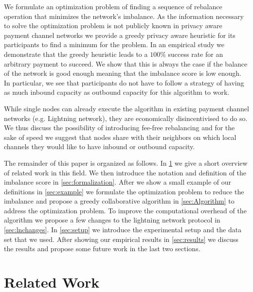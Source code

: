 \documentclass[a4paper]{paper}
\begin{document}
We formulate an optimization problem of finding a sequence of rebalance operation that minimizes the network's imbalance.
As the information necessary to solve the optimization problem is not publicly known in privacy aware payment channel networks we provide a greedy privacy aware heuristic for its participants to find a minimum for the problem. 
In an empirical study we demonstrate that the greedy heuristic leads to a $100\%$ success rate for an arbitrary payment to succeed.
We show that this is always the case if the balance of the network is good enough meaning that the imbalance score is low enough.
In particular, we see that participants do not have to follow a strategy of having as much inbound capacity as outbound capacity for this algorithm to work. 

While single nodes can already execute the algorithm in existing payment channel networks (e.g. Lightning network), they are economically disincentivised to do so.
We thus discuss the possibility of introducing fee-free rebalancing and for the sake of speed we suggest that nodes share with their neighbors on which local channels they would like to have inbound or outbound capacity. 

The remainder of this paper is organized as follows. 
In \cref{sec:relatedWork} we give a short overview of related work in this field.
We then introduce the notation and definition of the imbalance score in \cref{sec:formalization}.
After we show a small example of our definitions in \cref{sec:example} we formulate the optimization problem to reduce the imbalance and propose a greedy collaborative algorithm in \cref{sec:Algorithm} to address the optimization problem.
To improve the computational overhead of the algorithm we propose a few changes to the lightning network protocol in \cref{sec:lnchanges}.
In \cref{sec:setup} we introduce the experimental setup and the data set that we used.
After showing our empirical results in \cref{sec:results} we discuss the results and propose some future work in the last two sections.



\section{Related Work}
\label{sec:relatedWork}
\end{document}
